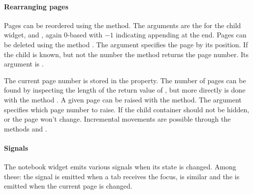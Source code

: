 \paragraph{Rearranging pages}
Pages can be reordered using the 
method. The arguments are the  for the
child widget, and , again 0-based with
$-1$ indicating appending at the end. Pages can be deleted using the
method . The
 argument specifies the page
by its position. If the child is known, but not the number the method
 returns the page number. Its argument is .

The current page number is stored in the  property.
The number of pages can be found by inspecting the length of the
return value of , but more directly
is done with the method . A given page
can be raised with the 
method. The argument 
specifies which page number to raise. If the child container should
not be hidden, or the page won't change. Incremental movements are
possible through the methods  and
. 

\paragraph{Signals}
The notebook widget emits various signals when its state is
changed. Among these: the signal  is emitted when a tab receives the
focus,  is similar and the  is
emitted when the current page is changed.

